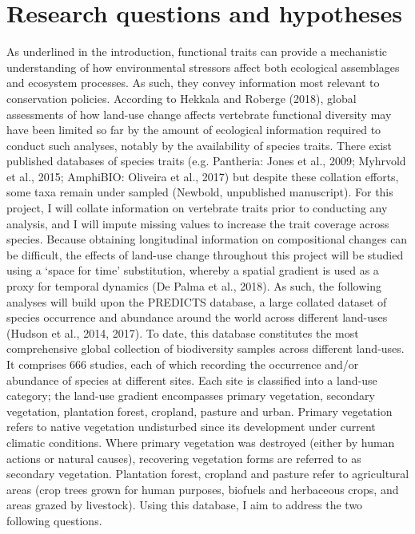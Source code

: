 \section{Research questions and hypotheses}
As underlined in the introduction, functional traits can provide a mechanistic understanding of how environmental stressors affect both ecological assemblages and ecosystem processes. As such, they convey information most relevant to conservation policies. According to Hekkala and Roberge (2018), global assessments of how land-use change affects vertebrate functional diversity may have been limited so far by the amount of ecological information required to conduct such analyses, notably by the availability of species traits. There exist published databases of species traits (e.g. Pantheria: Jones et al., 2009; Myhrvold et al., 2015; AmphiBIO: Oliveira et al., 2017) but despite these collation efforts, some taxa remain under sampled  (Newbold, unpublished manuscript). For this project, I will collate information on vertebrate traits prior to conducting any analysis, and I will impute missing values to increase the trait coverage across species. 
Because obtaining longitudinal information on compositional changes can be difficult, the effects of land-use change throughout this project will be studied using a ‘space for time’ substitution, whereby a spatial gradient is used as a proxy for temporal dynamics (De Palma et al., 2018). As such, the following analyses will build upon the PREDICTS database, a large collated dataset of species occurrence and abundance around the world across different land-uses (Hudson et al., 2014, 2017). To date, this database constitutes the most comprehensive global collection of biodiversity samples across different land-uses. It comprises 666 studies, each of which recording the occurrence and/or abundance of species at different sites. Each site is classified into a land-use category; the land-use gradient encompasses primary vegetation, secondary vegetation, plantation forest, cropland, pasture and urban. Primary vegetation refers to native vegetation undisturbed since its development under current climatic conditions. Where primary vegetation was destroyed (either by human actions or natural causes), recovering vegetation forms are referred to as secondary vegetation. Plantation forest, cropland and pasture refer to agricultural areas (crop trees grown for human purposes, biofuels and herbaceous crops, and areas grazed by livestock). Using this database, I aim to address the two following questions.

